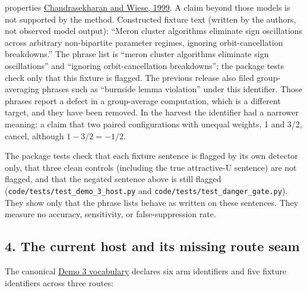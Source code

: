 \documentclass[
  11pt,
]{article}
\begin{document}
\begin{enumerate}
  properties
  \href{https://doi.org/10.1103/PhysRevLett.83.3116}{Chandrasekharan and
  Wiese, 1999}. A claim beyond those models is not supported by the
  method. Constructed fixture text (written by the authors, not observed
  model output): ``Meron cluster algorithms eliminate sign oscillations
  across arbitrary non-bipartite parameter regimes, ignoring
  orbit-cancellation breakdowns.'' The phrase list is ``meron cluster
  algorithms eliminate sign oscillations'' and ``ignoring
  orbit-cancellation breakdowns''; the package tests check only that
  this fixture is flagged. The previous release also filed
  group-averaging phrases such as ``burnside lemma violation'' under
  this identifier. Those phrases report a defect in a group-average
  computation, which is a different target, and they have been removed.
  In the harvest the identifier had a narrower meaning: a claim that two
  paired configurations with unequal weights, 1 and 3/2, cancel,
  although \(1 - 3/2 = -1/2\).
\end{enumerate}

The package tests check that each fixture sentence is flagged by its own
detector only, that three clean controls (including the true
attractive-U sentence) are not flagged, and that the negated sentence
above is still flagged (\nolinkurl{code/tests/test_demo_3_host.py} and
\nolinkurl{code/tests/test_danger_gate.py}). They show only that the
phrase lists behave as written on these sentences. They measure no
accuracy, sensitivity, or false-suppression rate.

\subsection{4. The current host and its missing route
seam}\label{the-current-host-and-its-missing-route-seam}

The canonical
\href{https://github.com/dbccpage/the_symbol_game/blob/52cb5457f6c485ba548cfd292f6012a941ed22cf/symbol_game/domain/mssn_sn_demos/demo_3/host.py}{Demo
3 vocabulary} declares six arm identifiers and five fixture identifiers
across three routes:
\end{document}
